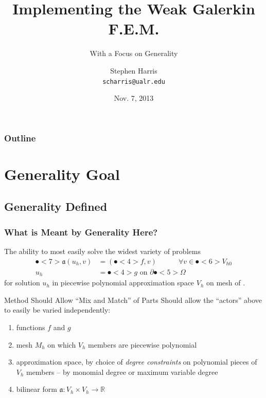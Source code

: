 \documentclass{beamer}
\title[Implementing WGFEM]{Implementing the Weak Galerkin F.E.M.}
\subtitle{With a Focus on Generality}
\author{Stephen Harris \\ \texttt{scharris@ualr.edu}}
\date{Nov. 7, 2013}
\begin{document}
\begin{frame}
  \titlepage
\end{frame}

\begin{frame}
  \frametitle{Outline}
  \tableofcontents[pausesections]
\end{frame}

\section{Generality Goal}
\subsection{Generality Defined}

\begin{frame}
  \frametitle{What is Meant by Generality Here?}
  \pause
  The ability to most easily solve the widest variety of problems
    \begin{align*}
      \spot<7>{\mathfrak{a}}(u_h,v) & = (\spot<4>{f},v)\quad\quad\quad \forall{v} \in \spot<6>{V_{h0}} \\
      u_h & = \spot<4>{g} \text{ on } \partial\spot<5>{\Omega}
    \end{align*}
    for solution $u_h$ in piecewise polynomial approximation space $V_h$ on mesh  of .
  \pause

  \begin{block}{Method Should Allow ``Mix and Match'' of Parts}
    Should allow the ``actors'' above to easily be varied independently:
    \pause
    \begin{enumerate}[<+->]
      \item functions $f$ and $g$
      \item mesh $M_h$ on which $V_h$ members are piecewise polynomial
      \item approximation space, by choice of \emph{degree constraints} on polynomial pieces of $V_h$ members -- by monomial degree or maximum variable degree
      \item bilinear form $\mathfrak{a}: V_h \times V_h \rightarrow \mathbb{R}$
    \end{enumerate}
  \end{block}

\end{frame}
\end{document}

